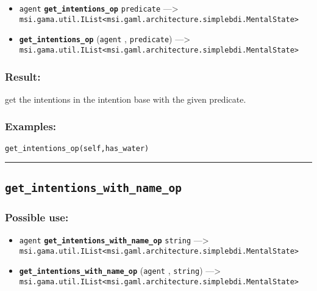 \documentclass[]{book}
\providecommand{\tightlist}{%
  \setlength{\itemsep}{0pt}\setlength{\parskip}{0pt}}
\theoremstyle{definition}
\theoremstyle{definition}
\theoremstyle{definition}
\theoremstyle{remark}
\begin{document}
\begin{itemize}
\tightlist
\item
  \texttt{agent} \textbf{\texttt{get\_intentions\_op}}
  \texttt{predicate} ---\textgreater{}
  \texttt{msi.gama.util.IList\textless{}msi.gaml.architecture.simplebdi.MentalState\textgreater{}}
\item
  \textbf{\texttt{get\_intentions\_op}} (\texttt{agent} ,
  \texttt{predicate}) ---\textgreater{}
  \texttt{msi.gama.util.IList\textless{}msi.gaml.architecture.simplebdi.MentalState\textgreater{}}
\end{itemize}

\subsubsection{Result:}\label{result-210}

get the intentions in the intention base with the given predicate.

\subsubsection{Examples:}\label{examples-163}

\begin{verbatim}
get_intentions_op(self,has_water) 
\end{verbatim}

\begin{center}\rule{0.5\linewidth}{\linethickness}\end{center}

\subsection{\texorpdfstring{\texttt{get\_intentions\_with\_name\_op}}{get\_intentions\_with\_name\_op}}\label{get_intentions_with_name_op}

\subsubsection{Possible use:}\label{possible-use-217}

\begin{itemize}
\tightlist
\item
  \texttt{agent} \textbf{\texttt{get\_intentions\_with\_name\_op}}
  \texttt{string} ---\textgreater{}
  \texttt{msi.gama.util.IList\textless{}msi.gaml.architecture.simplebdi.MentalState\textgreater{}}
\item
  \textbf{\texttt{get\_intentions\_with\_name\_op}} (\texttt{agent} ,
  \texttt{string}) ---\textgreater{}
  \texttt{msi.gama.util.IList\textless{}msi.gaml.architecture.simplebdi.MentalState\textgreater{}}
\end{itemize}
\end{document}
